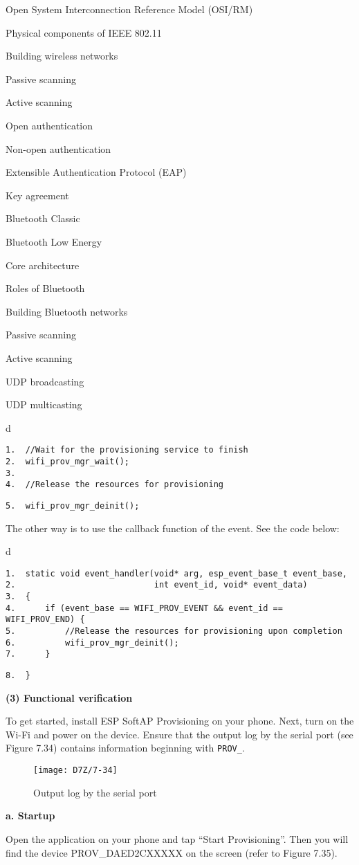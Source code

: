 \documentclass[a4paper,12pt]{book}
\begin{document}
\begin{term}{Open System Interconnection Reference Model (OSI/RM)}
\begin{term}{Physical components of IEEE 802.11}
\begin{term}{Building wireless networks}
\begin{term}{Passive scanning}
\begin{term}{Active scanning}
\begin{term}{Open authentication}
\begin{term}{Non-open authentication}
\begin{term}{Extensible Authentication Protocol (EAP)}
\begin{term}{Key agreement}
\begin{term}{Bluetooth Classic}
\begin{term}{Bluetooth Low Energy}
\begin{term}{Core architecture}
\begin{term}{Roles of Bluetooth}
\begin{term}{Building Bluetooth networks}
\begin{term}{Passive scanning}
\begin{term}{Active scanning}
\begin{term}{UDP broadcasting}
\begin{term}{UDP multicasting}
\begin{tabular}{d}
\vspace{2pt}
\begin{verbatim}
1.  //Wait for the provisioning service to finish
2.  wifi_prov_mgr_wait();
3.
4.  //Release the resources for provisioning
\end{verbatim}
\verb|5.  wifi_prov_mgr_deinit();|
\end{tabular}


The other way is to use the callback function of the event. See the code below:


\begin{tabular}{d}
\vspace{2pt}
\begin{verbatim}
1.  static void event_handler(void* arg, esp_event_base_t event_base,
2.                            int event_id, void* event_data)
3.  {
4.      if (event_base == WIFI_PROV_EVENT && event_id == WIFI_PROV_END) {
5.          //Release the resources for provisioning upon completion
6.          wifi_prov_mgr_deinit();
7.      }
\end{verbatim}
\verb|8.  }|
\end{tabular}


\textbf{(3) Functional verification}

To get started, install ESP SoftAP Provisioning on your phone. Next, turn on the Wi-Fi and power on the device. Ensure that the output log by the serial port (see Figure 7.34) contains information beginning with \verb|PROV_|. 


\begin{figure}[!h]
    \centering
    \texttt{[image: D7Z/7-34]}
    \caption{Output log by the serial port}
\end{figure}

\textbf{a. Startup}

Open the application on your phone and tap “Start Provisioning”. Then you will find the device PROV\_DAED2CXXXXX on the screen (refer to Figure 7.35).


\end{term}
\end{term}
\end{term}
\end{term}
\end{term}
\end{term}
\end{term}
\end{term}
\end{term}
\end{term}
\end{term}
\end{term}
\end{term}
\end{term}
\end{term}
\end{term}
\end{term}
\end{term}
\end{document}
